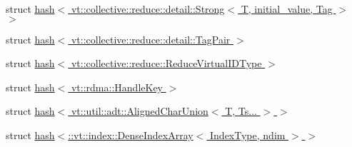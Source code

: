 \begin{DoxyCompactItemize}
struct \hyperlink{structstd_1_1hash_3_01vt_1_1collective_1_1reduce_1_1detail_1_1_strong_3_01_t_00_01initial__value_00_01_tag_01_4_01_4}{hash$<$ vt\+::collective\+::reduce\+::detail\+::\+Strong$<$ T, initial\+\_\+value, Tag $>$ $>$}
\item 
struct \hyperlink{structstd_1_1hash_3_01vt_1_1collective_1_1reduce_1_1detail_1_1_tag_pair_01_4}{hash$<$ vt\+::collective\+::reduce\+::detail\+::\+Tag\+Pair $>$}
\item 
struct \hyperlink{structstd_1_1hash_3_01vt_1_1collective_1_1reduce_1_1_reduce_virtual_i_d_type_01_4}{hash$<$ vt\+::collective\+::reduce\+::\+Reduce\+Virtual\+I\+D\+Type $>$}
\item 
struct \hyperlink{structstd_1_1hash_3_01vt_1_1rdma_1_1_handle_key_01_4}{hash$<$ vt\+::rdma\+::\+Handle\+Key $>$}
\item 
struct \hyperlink{structstd_1_1hash_3_01vt_1_1util_1_1adt_1_1_aligned_char_union_3_01_t_00_01_ts_8_8_8_01_4_01_4}{hash$<$ vt\+::util\+::adt\+::\+Aligned\+Char\+Union$<$ T, Ts... $>$ $>$}
\item 
struct \hyperlink{structstd_1_1hash_3_1_1vt_1_1index_1_1_dense_index_array_3_01_index_type_00_01ndim_01_4_01_4}{hash$<$\+::vt\+::index\+::\+Dense\+Index\+Array$<$ Index\+Type, ndim $>$ $>$}
\end{DoxyCompactItemize}
